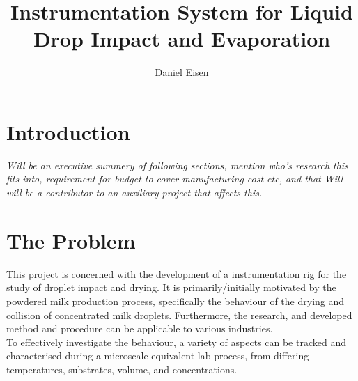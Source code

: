 \documentclass[11pt, a4paper, twoside, openright]{report}
\title{Instrumentation System for Liquid Drop Impact and Evaporation}
\author{Daniel Eisen}
\date{}
\begin{document}
\frontmatter


\begin{abstract}
\end{abstract}


\maketitle
\tableofcontents



\mainmatter


\section{Introduction}
\textit{Will be an executive summery of following sections, mention who's research this fits into, requirement for budget to cover manufacturing cost etc, and that Will will be a contributor to an auxiliary project that affects this.}






\section{The Problem}
This project is concerned with the development of a instrumentation rig for the study of droplet impact and drying. It is primarily/initially motivated by the powdered milk production process, specifically the behaviour of the drying and collision of concentrated milk droplets. Furthermore, the research, and developed method and procedure can be applicable to various industries. \\

To effectively investigate the behaviour, a variety of aspects can be tracked and characterised during a microscale equivalent lab process, from differing temperatures, substrates, volume, and concentrations. \\
\end{document}
